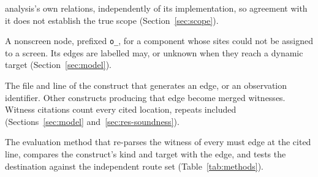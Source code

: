 \documentclass[english,12pt,a4paper,sci,utf8,a-2b,online]{aaltothesis}
\numberwithin{table}{section}
\numberwithin{figure}{section}
\numberwithin{equation}{section}
\begin{document}
\begin{description}[nosep]
analysis's own relations, independently of its implementation, so agreement with it does not
establish the true scope (Section~\ref{sec:scope}).
\item[Unplaced origin] A nonscreen node, prefixed \texttt{o\_}, for a component whose sites could
not be assigned to a screen. Its edges are labelled may, or unknown when they reach a dynamic target (Section~\ref{sec:model}).
\item[Witness, witness citation] The file and line of the construct that generates an edge, or an
observation identifier. Other constructs producing that edge become merged witnesses. Witness
citations count every cited location, repeats included (Sections~\ref{sec:model}
and~\ref{sec:res-soundness}).
\item[Witness check] The evaluation method that re-parses the witness of every must edge at the
cited line, compares the construct's kind and target with the edge, and tests the destination
against the independent route set (Table~\ref{tab:methods}).
\end{description}

\clearpage









\clearpage
\thesisbibliography


\clearpage

\end{document}
